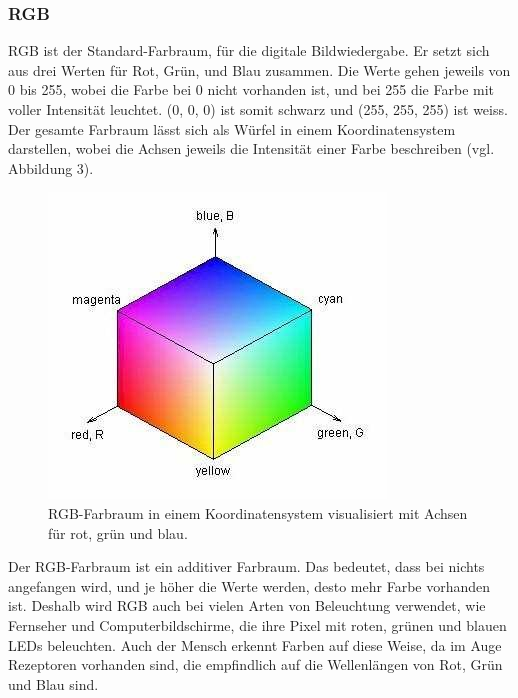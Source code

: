 \documentclass[a4paper, 12pt]{article}
\begin{document}
\subsubsection{RGB}
RGB ist der Standard-Farbraum, für die digitale Bildwiedergabe. Er setzt sich aus drei Werten für Rot, Grün, und Blau zusammen. Die Werte gehen jeweils von 0 bis 255, wobei die Farbe bei 0 nicht vorhanden ist, und bei 255 die Farbe mit voller Intensität leuchtet. (0, 0, 0) ist somit schwarz und (255, 255, 255) ist weiss. Der gesamte Farbraum lässt sich als Würfel in einem Koordinatensystem darstellen, wobei die Achsen jeweils die Intensität einer Farbe beschreiben (vgl. Abbildung 3).
\begin{figure}[H]
\includegraphics[scale=0.5]{RGB_Wuerfel}
\caption{RGB-Farbraum in einem Koordinatensystem visualisiert mit Achsen für rot, grün und blau. \cite{RGBBild}}
\end{figure}
 Der RGB-Farbraum ist ein additiver Farbraum. Das bedeutet, dass bei nichts angefangen wird, und je höher die Werte werden, desto mehr Farbe vorhanden ist. \cite{RGBHSV} Deshalb wird RGB auch bei vielen Arten von Beleuchtung verwendet, wie Fernseher und Computerbildschirme, die ihre Pixel mit roten, grünen und blauen LEDs beleuchten. Auch der Mensch erkennt Farben auf diese Weise, da im Auge Rezeptoren vorhanden sind, die empfindlich auf die Wellenlängen von Rot, Grün und Blau sind.
\end{document}
